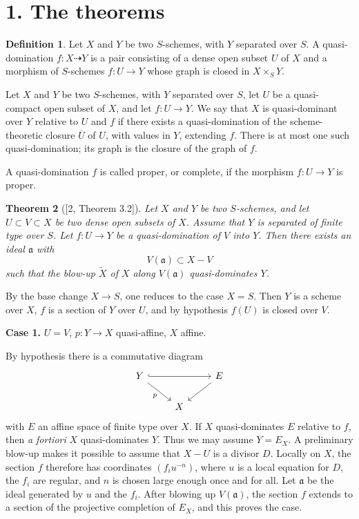 \documentclass[11pt,a4paper]{article}
\theoremstyle{plain}
\newtheorem{theorem}{Theorem}
\theoremstyle{definition}
\newtheorem{definition}[theorem]{Definition}
\begin{document}
\section*{1. The theorems}

\begin{definition}
Let $X$ and $Y$ be two $S$-schemes, with $Y$ separated over $S$. A quasi-domination $f:X\dashrightarrow Y$ is a pair consisting of a dense open subset $U$ of $X$ and a morphism of $S$-schemes $f:U\to Y$ whose graph is closed in $X\times_S Y$.

Let $X$ and $Y$ be two $S$-schemes, with $Y$ separated over $S$, let $U$ be a quasi-compact open subset of $X$, and let $f:U\to Y$. We say that $X$ is quasi-dominant over $Y$ relative to $U$ and $f$ if there exists a quasi-domination of the scheme-theoretic closure $\overline U$ of $U$, with values in $Y$, extending $f$. There is at most one such quasi-domination; its graph is the closure of the graph of $f$.

A quasi-domination $f$ is called proper, or complete, if the morphism $f:U\to Y$ is proper.
\end{definition}

\begin{theorem}[{[2, Theorem 3.2]}]
Let $X$ and $Y$ be two $S$-schemes, and let $U\subset V\subset X$ be two dense open subsets of $X$. Assume that $Y$ is separated of finite type over $S$. Let $f:U\to Y$ be a quasi-domination of $V$ into $Y$. Then there exists an ideal $\mathfrak a$ with
\[
V(\mathfrak a)\subset X-V
\]
such that the blow-up $\widetilde X$ of $X$ along $V(\mathfrak a)$ quasi-dominates $Y$.
\end{theorem}

By the base change $X\to S$, one reduces to the case $X=S$. Then $Y$ is a scheme over $X$, $f$ is a section of $Y$ over $U$, and by hypothesis $f(U)$ is closed over $V$.

\smallskip
\noindent\textbf{Case 1.} $U=V$, $p:Y\to X$ quasi-affine, $X$ affine.

By hypothesis there is a commutative diagram
\[
\begin{tikzcd}
Y \arrow[rr,hook] \arrow[dr,"p"'] && E \arrow[dl] \\
& X
\end{tikzcd}
\]
with $E$ an affine space of finite type over $X$. If $X$ quasi-dominates $E$ relative to $f$, then \emph{a fortiori} $X$ quasi-dominates $Y$. Thus we may assume $Y=E_X$. A preliminary blow-up makes it possible to assume that $X-U$ is a divisor $D$. Locally on $X$, the section $f$ therefore has coordinates $(f_i u^{-n})$, where $u$ is a local equation for $D$, the $f_i$ are regular, and $n$ is chosen large enough once and for all. Let $\mathfrak a$ be the ideal generated by $u$ and the $f_i$. After blowing up $V(\mathfrak a)$, the section $f$ extends to a section of the projective completion of $E_X$, and this proves the case.
\end{document}

